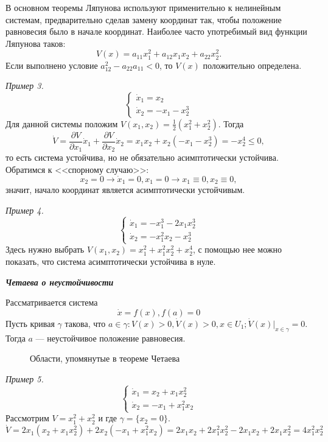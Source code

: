 В основном теоремы Ляпунова используют применительно к нелинейным системам, предварительно сделав замену координат так, чтобы положение равновесия было в начале координат. Наиболее часто употребимый вид функции Ляпунова таков:
$$ V(x) = a_{11} x_1^2 + a_{12}x_1x_2 +a_{22}x_2^2. $$
Если выполнено условие $a_{12}^2 - a_{22}a_{11} < 0$, то $V(x)$ положительно определена.

\textit{Пример 3.}
$$
\begin{cases} 
\dot x_1 = x_2 \\
\dot x_2 = - x_1 -x_2^3
\end{cases}
$$
Для данной системы положим $V(x_1, x_2) = \frac{1}{2} (x_1^2 + x_2^2).$ Тогда
$$
\dot V = \frac{\partial V}{\partial x_1} \dot x_1 +\frac{\partial V}{\partial x_2} \dot x_2 = x_1 x_2 + x_2 (- x_1 - x_2^3) = -x_2^4 \leqslant 0,$$
то есть система устойчива, но не обязательно асимптотически устойчива. Обратимся к <<спорному случаю>>:
$$
x_2 = 0 \rightarrow \dot x_1 = 0, x_1 = 0 \rightarrow x_1 \equiv 0, x_2 \equiv 0,
$$
значит, начало координат является асимптотически устойчивым.

\textit{Пример 4.}
$$
\begin{cases} 
\dot x_1 = - x_1^3 - 2 x_1 x_2^3 \\
\dot x_2 = - x_1^2 x_2 - x_2^3
\end{cases}
$$
Здесь нужно выбрать $V(x_1, x_2) = x_1^2 + x_1^2 x_2^2 + x_2^4$, с помощью нее можно показать, что система асимптотически устойчива в нуле.

\begin{theorem} \textit{\textbf{Четаева о неустойчивости}}

Рассматривается система 
$$
\dot x = f(x), f(a) =0
$$
Пусть кривая $\gamma$ такова, что $a \in \gamma: V(x) > 0, \dot V(x) > 0, x \in U_1; \dot V(x)\big |_{x \in \gamma} = 0.$ Тогда $a$ --- неустойчивое  положение равновесия.
\end{theorem}

\begin{figure}[h]
	\caption{Области, упомянутые в теореме Четаева}\label{ch4Chet}
	

\end{figure}

\textit{Пример 5.}
$$
\begin{cases} 
\dot x_1 = x_2 +  x_1 x_2^2 \\
\dot x_2 = - x_1 +  x_1^2 x_2
\end{cases}
$$
Рассмотрим $V = x_1^2 + x_2^2$ и где $\gamma = \big \{  x_2 = 0 \big \}.$
$$
\dot V = 2 x_1(x_2 + x_1x_2^2) + 2 x_2(-x_1 + x_1^2 x_2) = 2 x_1 x_2  + 2 x_1^2 x_2^2 - 2 x_1 x_2 + 2 x_1 x_2^2 = 4 x_1^2 x_2^2
$$
